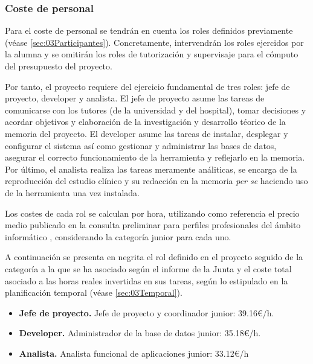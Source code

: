 \subsubsection{Coste de personal}

Para el coste de personal se tendrán en cuenta los roles definidos previamente (véase \ref{sec:03Participantes}). Concretamente, intervendrán los roles ejercidos por la alumna y se omitirán los roles de tutorización y supervisaje para el cómputo del presupuesto del proyecto.

Por tanto, el proyecto requiere del ejercicio fundamental de tres roles: jefe de proyecto, developer y analista. El jefe de proyecto asume las tareas de comunicarse con los tutores (de la universidad y del hospital), tomar decisiones y acordar objetivos y elaboración de la investigación y desarrollo téorico de la memoria del proyecto. El developer asume las tareas de instalar, desplegar y configurar el sistema así como gestionar y administrar las bases de datos, asegurar el correcto funcionamiento de la herramienta y reflejarlo en la memoria. Por último, el analista realiza las tareas meramente análiticas, se encarga de la reproducción del estudio clínico y su redacción en la memoria \textit{per se} haciendo uso de la herramienta una vez instalada.

Los costes de cada rol se calculan por hora, utilizando como referencia el precio medio publicado en la consulta preliminar para perfiles profesionales del ámbito informático \cite{informeJuntaAndalucia}, considerando la categoría junior para cada uno. 

A continuación se presenta en negrita el rol definido en el proyecto seguido de la categoría a la que se ha asociado según el informe de la Junta y el coste total asociado a las horas reales invertidas en sus tareas, según lo estipulado en la planificación temporal (véase \ref{sec:03Temporal}).

\begin{itemize}
    \item \textbf{Jefe de proyecto.} Jefe de proyecto y coordinador junior: 39.16€/h.


    \item \textbf{Developer.} Administrador de la base de datos junior: 35.18€/h.


    \item \textbf{Analista.} Analista funcional de aplicaciones junior: 33.12€/h


\end{itemize}

